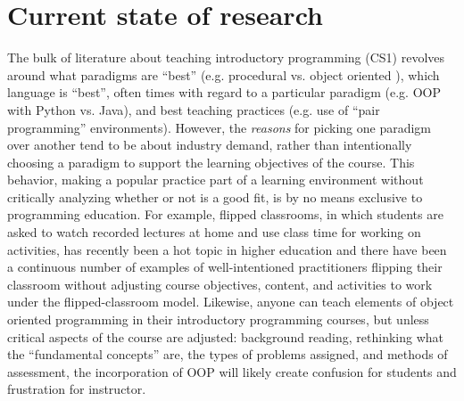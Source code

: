 \documentclass[12pt]{article}
\let\textcite=\autocite
\begin{document}

\section{Current state of research}
The bulk of literature about teaching introductory programming (CS1)
revolves around what paradigms are ``best'' (e.g. procedural
vs. object oriented
\autocite{bailie_objects_2003,moritz_objectsfirst_2005,reges_back_2006}),
which language is ``best'', often times with regard to a particular
paradigm (e.g. OOP with Python
vs. Java\autocite{goldwasser_teaching_2008,koulouri_teaching_2014}),
and best teaching practices (e.g. use of ``pair programming''
environments\autocite{williams_support_2001,mcdowell_effects_2002,thomas_code_2003,chong_social_2007,salleh_empirical_2011}). However,
the \emph{reasons} for picking one paradigm over another tend to be
about industry demand, rather than intentionally choosing a paradigm
to support the learning objectives of the course. This behavior,
making a popular practice part of a learning environment without
critically analyzing whether or not is a good fit, is by no means
exclusive to programming education. For example, flipped
classrooms\autocite{bishop_flipped_2013}, in which students are asked
to watch recorded lectures at home and use class time for working on
activities, has recently been a hot topic in higher education and
there have been a continuous number of examples of well-intentioned
practitioners flipping their classroom without adjusting course
objectives, content, and activities to work under the
flipped-classroom model\autocite{desantis_students_2015}. Likewise,
anyone can teach elements of object oriented programming in their
introductory programming courses, but unless critical aspects of the
course are adjusted: background reading, rethinking what the
``fundamental concepts'' are, the types of problems assigned, and
methods of assessment, the incorporation of OOP will likely create
confusion for students and frustration for
instructor\autocite{kolling_problem_1999}.
\end{document}

